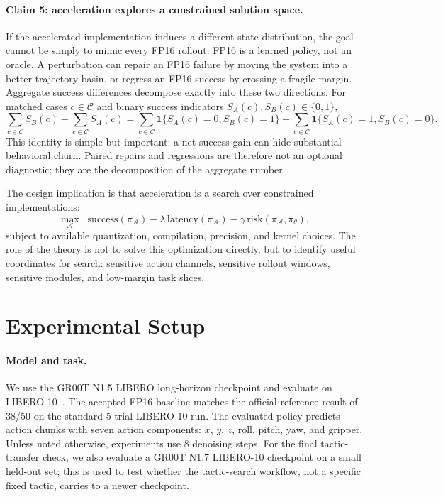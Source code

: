 \documentclass[10pt]{article}
\begin{document}
\paragraph{Claim 5: acceleration explores a constrained solution space.}
If the accelerated implementation induces a different state distribution, the goal cannot be simply to mimic every FP16 rollout. FP16 is a learned policy, not an oracle. A perturbation can repair an FP16 failure by moving the system into a better trajectory basin, or regress an FP16 success by crossing a fragile margin. Aggregate success differences decompose exactly into these two directions. For matched cases $c\in\mathcal{C}$ and binary success indicators $S_A(c), S_B(c)\in\{0,1\}$,
\begin{equation}
    \sum_{c\in\mathcal{C}} S_B(c) - \sum_{c\in\mathcal{C}} S_A(c)
    =
    \sum_{c\in\mathcal{C}} \mathbf{1}\{S_A(c)=0,S_B(c)=1\}
    -
    \sum_{c\in\mathcal{C}} \mathbf{1}\{S_A(c)=1,S_B(c)=0\}.
    \label{eq:repair-regression-identity}
\end{equation}
This identity is simple but important: a net success gain can hide substantial behavioral churn. Paired repairs and regressions are therefore not an optional diagnostic; they are the decomposition of the aggregate number.

The design implication is that acceleration is a search over constrained implementations:
\begin{equation}
    \max_{\mathcal{A}}
    \;\;
    \mathrm{success}(\pi_{\mathcal{A}})
    - \lambda\,\mathrm{latency}(\pi_{\mathcal{A}})
    - \gamma\,\mathrm{risk}(\pi_{\mathcal{A}},\pi_\theta),
\end{equation}
subject to available quantization, compilation, precision, and kernel choices. The role of the theory is not to solve this optimization directly, but to identify useful coordinates for search: sensitive action channels, sensitive rollout windows, sensitive modules, and low-margin task slices.

\section{Experimental Setup}

\paragraph{Model and task.}
We use the GR00T N1.5 LIBERO long-horizon checkpoint and evaluate on LIBERO-10~\citep{grootn1,libero}. The accepted FP16 baseline matches the official reference result of 38/50 on the standard 5-trial LIBERO-10 run. The evaluated policy predicts action chunks with seven action components: $x$, $y$, $z$, roll, pitch, yaw, and gripper. Unless noted otherwise, experiments use 8 denoising steps. For the final tactic-transfer check, we also evaluate a GR00T N1.7 LIBERO-10 checkpoint on a small held-out set; this is used to test whether the tactic-search workflow, not a specific fixed tactic, carries to a newer checkpoint.
\end{document}
